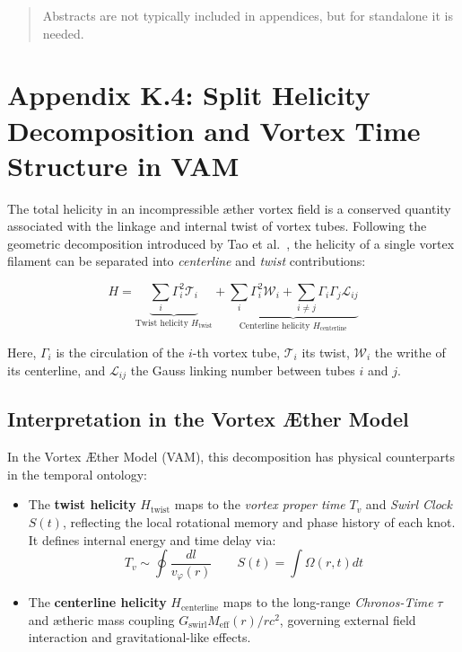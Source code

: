 \documentclass[12pt]{article}
\begin{document}
  \titlepageOpen

  \begin{abstract}
      Abstracts are not typically included in appendices, but for standalone it is needed.
  \end{abstract}

  \titlepageClose
\fi

\section{\appendixtitle}
  \appendix
  \section*{Appendix K.4: Split Helicity Decomposition and Vortex Time Structure in VAM}

  The total helicity in an incompressible æther vortex field is a conserved quantity associated with the linkage and internal twist of vortex tubes. Following the geometric decomposition introduced by Tao et al.~\cite{Tao2021}, the helicity of a single vortex filament can be separated into \emph{centerline} and \emph{twist} contributions:

  \begin{equation}
    H = \underbrace{\sum_i \Gamma_i^2 \mathcal{T}_i}_{\text{Twist helicity } H_\text{twist}}
    + \underbrace{\sum_i \Gamma_i^2 \mathcal{W}_i + \sum_{i \ne j} \Gamma_i \Gamma_j \mathcal{L}_{ij}}_{\text{Centerline helicity } H_\text{centerline}}
  \end{equation}

  Here, $\Gamma_i$ is the circulation of the $i$-th vortex tube, $\mathcal{T}_i$ its twist, $\mathcal{W}_i$ the writhe of its centerline, and $\mathcal{L}_{ij}$ the Gauss linking number between tubes $i$ and $j$.

  \subsection*{Interpretation in the Vortex \AE{}ther Model}

  In the Vortex \AE{}ther Model (VAM), this decomposition has physical counterparts in the temporal ontology:

  \begin{itemize}
    \item The \textbf{twist helicity} $H_\text{twist}$ maps to the \emph{vortex proper time} $T_v$ and \emph{Swirl Clock} $S(t)$, reflecting the local rotational memory and phase history of each knot. It defines internal energy and time delay via:
    \[
      T_v \sim \oint \frac{dl}{v_\varphi(r)} \qquad S(t) = \int \Omega(r, t) dt
    \]
    \item The \textbf{centerline helicity} $H_\text{centerline}$ maps to the long-range \emph{Chronos-Time} $\tau$ and ætheric mass coupling $G_{\text{swirl}} M_{\text{eff}}(r) / rc^2$, governing external field interaction and gravitational-like effects.
  \end{itemize}
\end{document}
